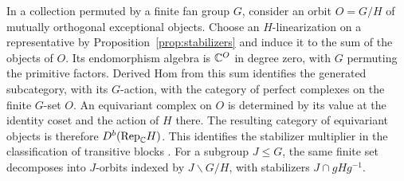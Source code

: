 In a collection permuted by a finite fan group $G$, consider an orbit $O=G/H$ of mutually orthogonal exceptional objects. Choose an $H$-linearization on a representative by Proposition~\ref{prop:stabilizers} and induce it to the sum of the objects of $O$. Its endomorphism algebra is $\mathbb C^O$ in degree zero, with $G$ permuting the primitive factors. Derived Hom from this sum identifies the generated subcategory, with its $G$-action, with the category of perfect complexes on the finite $G$-set $O$. An equivariant complex on $O$ is determined by its value at the identity coset and the action of $H$ there. The resulting category of equivariant objects is therefore $D^b(\mathrm{Rep}_{\mathbb C} H)$. This identifies the stabilizer multiplier in the classification of transitive blocks \cite[Corollary~3.42]{ESS}. For a subgroup $J\le G$, the same finite set decomposes into $J$-orbits indexed by $J\backslash G/H$, with stabilizers $J\cap gHg^{-1}$.
